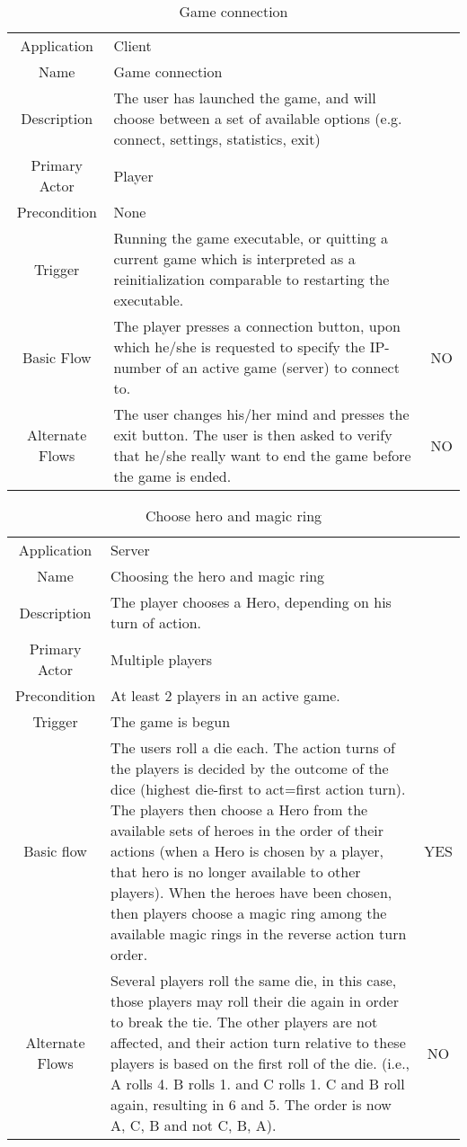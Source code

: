 \documentclass[a4paper,10pt]{report}
\begin{document}
\begin{table}
\label{connection}
\caption{Game connection}
\begin{tabular}{|c| p{9cm}|c}
\hline
Application	& Client  & \\
Name & Game connection  & \\
Description	& The user has launched the game, and will choose between a set of available options (e.g. connect, settings, statistics, exit)  & \\
Primary Actor & Player & \\
Precondition &None & \\
Trigger & Running the game executable, or quitting a current game which is interpreted as a reinitialization comparable to restarting the executable.  & \\ \hline
Basic Flow & The player presses a connection button, upon which he/she is  requested to specify the IP-number of an active game (server) to connect to.  & NO \\ \hline
Alternate Flows & The user changes his/her mind and presses the exit button. The user is then asked to verify that he/she really want to end the game before the game is ended.  & NO \\
\hline
\end{tabular}
\end{table}


\begin{table}
\label{choosehero}
\caption{Choose hero and magic ring}
\begin{tabular}{|c| p{9cm}|c}
\hline
Application & Server & \\
Name & Choosing the hero and magic ring & \\
Description & The player chooses a Hero, depending on his turn of action. & \\
Primary Actor & Multiple players & \\
Precondition & At least 2 players in an active game. & \\
Trigger & The game is begun & \\ \hline
Basic flow & The users roll a die each. The action turns of the players is decided by the outcome of the dice (highest die-first to act=first action turn). The players then choose a Hero from the available sets of heroes in the order of their actions (when a Hero is chosen by a player, that hero is no longer available to other players). When the heroes have been chosen, then players choose a magic ring among the available magic rings in the reverse action turn order. & YES \\ \hline
Alternate Flows & Several players roll the same die, in this case, those players may roll their die again in order to break the tie. The other players are not affected, and their action turn relative to these players is based on the first roll of the die. (i.e., A rolls 4. B rolls 1. and C rolls 1. C and B roll again, resulting in 6 and 5. The order is now A, C, B and not C, B, A). & NO\\
\hline
\end{tabular}
\end{table}
\end{document}
